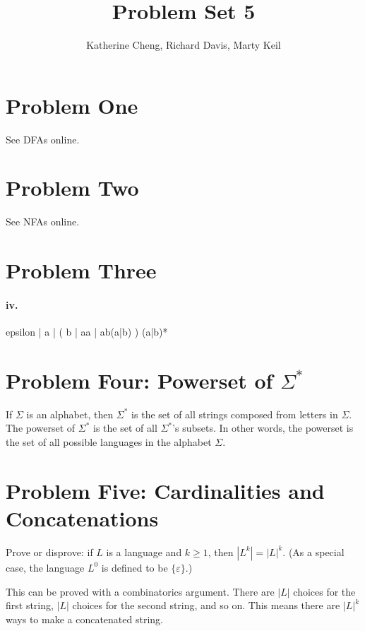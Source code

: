 \documentclass[10pt,letter]{article}
\begin{document}

\title{Problem Set 5}

\author{Katherine Cheng, Richard Davis, Marty Keil}

 
\maketitle 

\section*{Problem One} See DFAs online.

\section*{Problem Two} See NFAs online.

\section*{Problem Three} 

\paragraph{iv.} 
epsilon | a | ( b | aa | ab(a|b) ) (a|b)*

\section*{Problem Four: Powerset of $\Sigma^*$}
If $\Sigma$ is an alphabet, then $\Sigma^*$ is the set of all strings composed from letters in $\Sigma$. The powerset of $\Sigma^*$ is the set of all $\Sigma^*$'s subsets. In other words, the powerset is the set of all possible languages in the alphabet $\Sigma$. 

\section*{Problem Five: Cardinalities and Concatenations}
Prove or disprove: if $L$ is a language and $k \ge 1$, then $|L^k| = |L|^k$. (As a special case, the language $L^0$ is defined to be $\{\varepsilon\}$.) 

This can be proved with a combinatorics argument. There are $|L|$ choices for the first string, $|L|$ choices for the second string, and so on. This means there are $|L|^k$ ways to make a concatenated string. 
\end{document}
